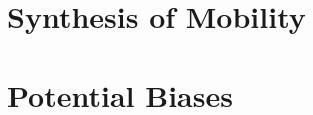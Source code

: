 \documentclass[journal]{IEEEtran}
\begin{document}
\section{Synthesis of Mobility} \label{sec:synthesis}


\section{Potential Biases} \label{sec:bias}

%
%



%
%
\end{document}
